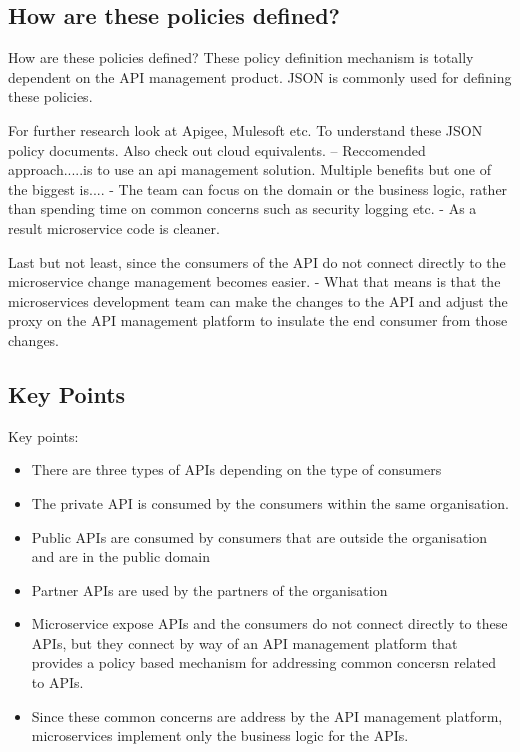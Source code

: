 \documentclass[a4paper, 11pt]{book}
\begin{document}
    \subsection{How are these policies defined?}
    How are these policies defined?
    These policy definition mechanism is totally dependent on the API management product.
    JSON is commonly used for defining these policies.

    For further research look at Apigee, Mulesoft etc.
    To understand these JSON policy documents. Also check out cloud equivalents.
    -- Reccomended approach.....is to use an api management solution.
    Multiple benefits but one of the biggest is....
    - The team can focus on the domain or the business logic, rather than spending time on common concerns such as security logging etc.
    - As a result microservice code is cleaner.

    Last but not least, since the consumers of the API do not connect directly to the microservice change management becomes easier.
    - What that means is that the microservices development team can make the changes to the API and adjust the proxy on the API management platform to insulate the end consumer from those changes.

    \subsection{Key Points}
    Key points:
    \begin{itemize}
        \item There are three types of APIs depending on the type of consumers
        \item The private API is consumed by the consumers within the same organisation.
        \item Public APIs are consumed by consumers that are outside the organisation and are in the public domain
        \item Partner APIs are used by the partners of the organisation
        \item Microservice expose APIs and the consumers do not connect directly to these APIs, but they connect by way of an API management platform that provides a policy based mechanism for addressing common concersn related to APIs.
        \item Since these common concerns are address by the API management platform, microservices implement only the business logic for the APIs.
    \end{itemize}
\end{document}
